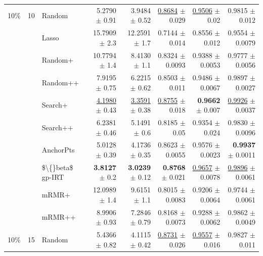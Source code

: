 \begin{longtable}{llp{}rrrrr}
\midrule
10\% & 10 & Random & 5.2790 {\scriptsize $\pm$ 0.91} & 3.9484 {\scriptsize $\pm$ 0.52} & \underline{0.8684} {\scriptsize $\pm$ 0.029} & \underline{0.9506} {\scriptsize $\pm$ 0.02} & 0.9815 {\scriptsize $\pm$ 0.012} \\
 &  & Lasso & 15.7909 {\scriptsize $\pm$ 2.3} & 12.2591 {\scriptsize $\pm$ 1.7} & 0.7144 {\scriptsize $\pm$ 0.014} & 0.8556 {\scriptsize $\pm$ 0.012} & 0.9554 {\scriptsize $\pm$ 0.0079} \\
 &  & Random+ & 10.7794 {\scriptsize $\pm$ 1.4} & 8.4130 {\scriptsize $\pm$ 1.1} & 0.8324 {\scriptsize $\pm$ 0.0093} & 0.9388 {\scriptsize $\pm$ 0.0053} & 0.9777 {\scriptsize $\pm$ 0.0056} \\
 &  & Random++ & 7.9195 {\scriptsize $\pm$ 0.75} & 6.2215 {\scriptsize $\pm$ 0.62} & 0.8503 {\scriptsize $\pm$ 0.011} & 0.9486 {\scriptsize $\pm$ 0.0067} & 0.9897 {\scriptsize $\pm$ 0.0027} \\
 &  & Search+ & \underline{4.1980} {\scriptsize $\pm$ 0.43} & \underline{3.3591} {\scriptsize $\pm$ 0.38} & \underline{0.8755} {\scriptsize $\pm$ 0.018} & \textbf{0.9662} {\scriptsize $\pm$ 0.007} & \underline{0.9926} {\scriptsize $\pm$ 0.0037} \\
 &  & Search++ & 6.2381 {\scriptsize $\pm$ 0.46} & 5.1491 {\scriptsize $\pm$ 0.6} & 0.8185 {\scriptsize $\pm$ 0.05} & 0.9354 {\scriptsize $\pm$ 0.024} & 0.9830 {\scriptsize $\pm$ 0.0096} \\
 &  & AnchorPts & 5.0128 {\scriptsize $\pm$ 0.39} & 4.1736 {\scriptsize $\pm$ 0.35} & 0.8623 {\scriptsize $\pm$ 0.0055} & 0.9576 {\scriptsize $\pm$ 0.0023} & \textbf{0.9937} {\scriptsize $\pm$ 0.0011} \\
 &  & \$\textbackslash\{\}beta\$ gp-IRT & \textbf{3.8127} {\scriptsize $\pm$ 0.2} & \textbf{3.0239} {\scriptsize $\pm$ 0.12} & \textbf{0.8768} {\scriptsize $\pm$ 0.021} & \underline{0.9657} {\scriptsize $\pm$ 0.0078} & \underline{0.9896} {\scriptsize $\pm$ 0.0061} \\
 &  & mRMR+ & 12.0989 {\scriptsize $\pm$ 1.4} & 9.6151 {\scriptsize $\pm$ 1.1} & 0.8015 {\scriptsize $\pm$ 0.0083} & 0.9206 {\scriptsize $\pm$ 0.0064} & 0.9744 {\scriptsize $\pm$ 0.0061} \\
 &  & mRMR++ & 8.9906 {\scriptsize $\pm$ 0.93} & 7.2846 {\scriptsize $\pm$ 0.79} & 0.8168 {\scriptsize $\pm$ 0.0073} & 0.9288 {\scriptsize $\pm$ 0.0062} & 0.9862 {\scriptsize $\pm$ 0.0049} \\
\midrule
10\% & 15 & Random & 5.4366 {\scriptsize $\pm$ 0.82} & 4.1115 {\scriptsize $\pm$ 0.42} & \underline{0.8731} {\scriptsize $\pm$ 0.026} & \underline{0.9557} {\scriptsize $\pm$ 0.016} & 0.9827 {\scriptsize $\pm$ 0.011} \\

\end{longtable}
